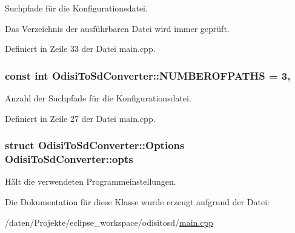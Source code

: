 Suchpfade für die Konfigurationsdatei. 

Das Verzeichnis der ausführbaren Datei wird immer geprüft. 

Definiert in Zeile 33 der Datei main.\-cpp.

\hypertarget{classOdisiToSdConverter_a6f59f3670356c1588b736af33d59532a}{
\subsubsection[{N\-U\-M\-B\-E\-R\-O\-F\-P\-A\-T\-H\-S}]{\setlength{\rightskip}{0pt plus 5cm}const int Odisi\-To\-Sd\-Converter\-::\-N\-U\-M\-B\-E\-R\-O\-F\-P\-A\-T\-H\-S = 3\hspace{0.3cm}{\ttfamily [static]}, {\ttfamily [protected]}}}\label{classOdisiToSdConverter_a6f59f3670356c1588b736af33d59532a}


Anzahl der Suchpfade für die Konfigurationsdatei. 



Definiert in Zeile 27 der Datei main.\-cpp.

\hypertarget{classOdisiToSdConverter_a032865606668d520887b2b164913539d}{
\subsubsection[{opts}]{\setlength{\rightskip}{0pt plus 5cm}struct {\bf Odisi\-To\-Sd\-Converter\-::\-Options}  Odisi\-To\-Sd\-Converter\-::opts\hspace{0.3cm}{\ttfamily [protected]}}}\label{classOdisiToSdConverter_a032865606668d520887b2b164913539d}


Hält die verwendeten Programmeinstellungen. 



Die Dokumentation für diese Klasse wurde erzeugt aufgrund der Datei\-:\begin{DoxyCompactItemize}
\item 
/daten/\-Projekte/eclipse\-\_\-workspace/odisitosd/\hyperlink{odisitosd_2main_8cpp}{main.\-cpp}\end{DoxyCompactItemize}
